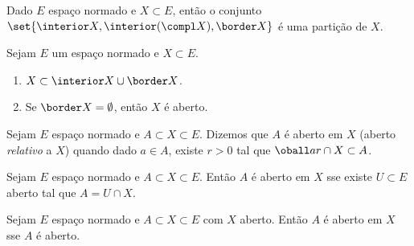 \begin{fact}
	Dado $E$ espaço normado e $X \subset E$, então o conjunto 
	$\set{\interior X, \interior(\compl X), \border X}$ é uma partição de $X$.
\end{fact}

\begin{fact}
	Sejam $E$ um espaço normado e $X \subset E$.
	\begin{enumerate}
		\item $X \subset \interior X \cup \border X$.
		\item Se $\border X = \emptyset$, então $X$ é aberto.
	\end{enumerate}
\end{fact}

\begin{definition}
	Sejam $E$ espaço normado e $A \subset X \subset E$. Dizemos que 
	$A$ é aberto em $X$ (aberto \emph{relativo} a $X$) quando dado $a \in A$,
	existe $r > 0$ tal que $\oball ar \cap X \subset A$.
\end{definition}

\begin{theorem}
	Sejam $E$ espaço normado e $A \subset X \subset E$. Então 
	$A$ é aberto em $X$ sse existe $U \subset E$ aberto tal que 
	$A = U \cap X$.
\end{theorem}

\begin{fact}
	Sejam $E$ espaço normado e $A \subset X \subset E$ com $X$ aberto. 
	Então $A$ é aberto em $X$ sse $A$ é aberto.
\end{fact}